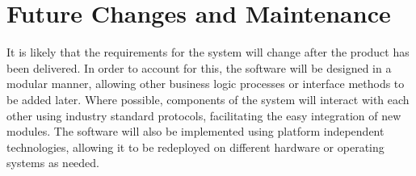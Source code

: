 \documentclass[8pt]{extarticle}
\begin{document}
\section{Future Changes and Maintenance}

It is likely that the requirements for the system will change after the product has been delivered.  In order to account for this, the software will be designed in a modular manner, allowing other business logic processes or interface methods to be added later. Where possible, components of the system will interact with each other using industry standard protocols, facilitating the easy integration of new modules. The software will also be implemented using platform independent technologies, allowing it to be redeployed on different hardware or operating systems as needed. 
\end{document}

